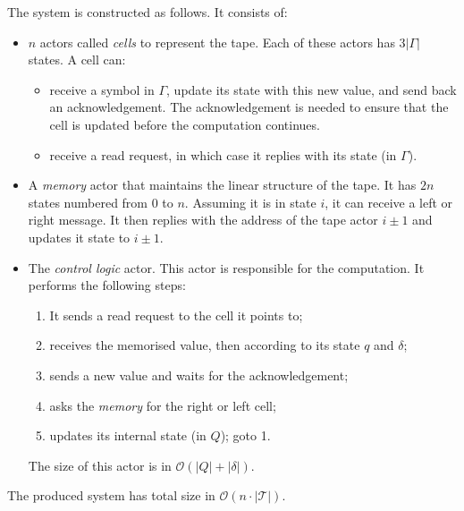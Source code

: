 \documentclass[a4paper]{report}
\numberwithin{algorithm}{chapter}
\begin{document}
The system is constructed as follows. It consists of:
\begin{itemize}
\item $n$ actors called \emph{cells} to represent the tape.
Each of these actors has $3 |\Gamma|$ states.
A cell can:
\begin{itemize}
\item receive a symbol in $\Gamma$, update its state with this new value, and send back an acknowledgement.
The acknowledgement is needed to ensure that the cell is updated before the computation continues.
\item receive a read request, in which case it replies with its state (in $\Gamma$).
\end{itemize}

\item A \emph{memory} actor that maintains the linear structure of the tape.
It has $2n$ states numbered from 0 to $n$.
Assuming it is in state $i$, it can receive a left or right message.
It then replies with the address of the tape actor $i \pm 1$ and updates it state to $i \pm 1$.

\item The \emph{control logic} actor.
This actor is responsible for the computation.
It performs the following steps:
\begin{enumerate}
\item It sends a read request to the cell it points to;
\item receives the memorised value, then according to its state $q$ and $\delta$;
\item sends a new value and waits for the acknowledgement;
\item asks the \emph{memory} for the right or left cell;
\item updates its internal state (in $Q$); goto 1.
\end{enumerate}
The size of this actor is in $\mathcal{O}(|Q| + |\delta|)$.

\end{itemize}

The produced system has total size in $\mathcal{O}(n \cdot |\mathcal{T}|)$.
\end{document}
